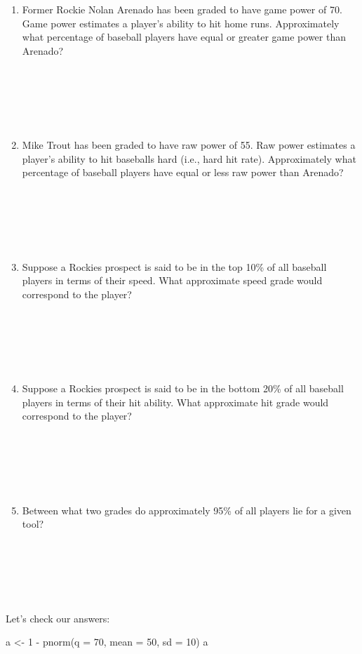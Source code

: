 \documentclass[
  11pt,
]{book}
\newenvironment{Shaded}{\begin{snugshade}}{\end{snugshade}}
\newcommand{\AttributeTok}[1]{\textcolor[rgb]{0.77,0.63,0.00}{#1}}
\newcommand{\DecValTok}[1]{\textcolor[rgb]{0.00,0.00,0.81}{#1}}
\newcommand{\FunctionTok}[1]{\textcolor[rgb]{0.00,0.00,0.00}{#1}}
\newcommand{\NormalTok}[1]{#1}
\newcommand{\OtherTok}[1]{\textcolor[rgb]{0.56,0.35,0.01}{#1}}
\newcommand{\SpecialCharTok}[1]{\textcolor[rgb]{0.00,0.00,0.00}{#1}}
\theoremstyle{definition}
\theoremstyle{definition}
\theoremstyle{definition}
\theoremstyle{definition}
\theoremstyle{remark}
\begin{document}
\begin{enumerate}
\def\labelenumi{(\alph{enumi})}
\item
  Former Rockie Nolan Arenado has been graded to have game power of 70. Game power estimates a player's ability to hit home runs. Approximately what percentage of baseball players have equal or greater game power than Arenado?\\
  \strut \\
  \strut \\
  \strut \\
\item
  Mike Trout has been graded to have raw power of 55. Raw power estimates a player's ability to hit baseballs hard (i.e., hard hit rate). Approximately what percentage of baseball players have equal or less raw power than Arenado?\\
  \strut \\
  \strut \\
  \strut \\
\item
  Suppose a Rockies prospect is said to be in the top 10\% of all baseball players in terms of their speed. What approximate speed grade would correspond to the player?\\
  \strut \\
  \strut \\
  \strut \\
\item
  Suppose a Rockies prospect is said to be in the bottom 20\% of all baseball players in terms of their hit ability. What approximate hit grade would correspond to the player?\\
  \strut \\
  \strut \\
  \strut \\
\item
  Between what two grades do approximately 95\% of all players lie for a given tool?\\
  \strut \\
  \strut \\
  \strut \\
\end{enumerate}

Let's check our answers:

\begin{Shaded}
\begin{Highlighting}[]
\NormalTok{a }\OtherTok{\textless{}{-}} \DecValTok{1} \SpecialCharTok{{-}} \FunctionTok{pnorm}\NormalTok{(}\AttributeTok{q =} \DecValTok{70}\NormalTok{, }\AttributeTok{mean =} \DecValTok{50}\NormalTok{, }\AttributeTok{sd =} \DecValTok{10}\NormalTok{)}
\NormalTok{a}
\end{Highlighting}
\end{Shaded}
\end{document}

